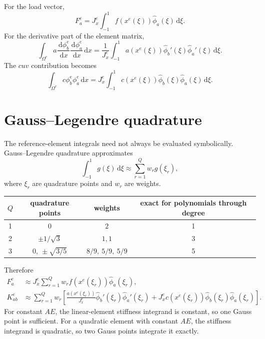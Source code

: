 \documentclass[11pt]{article}
\newcommand{\Om}{\Omega}
\newcommand{\dd}{\,\mathrm{d}}
\begin{document}
For the load vector,
\begin{equation}
F_a^e
=
J_x^e\int_{-1}^{1}
f(x^e(\xi))\widehat\phi_a(\xi)\dd\xi.
\label{eq:ref-load}
\end{equation}
For the derivative part of the element matrix,
\begin{equation}
\int_{\Om^e}
a\frac{\dd\phi_b^e}{\dd x}
\frac{\dd\phi_a^e}{\dd x}\dd x
=
\frac{1}{J_x^e}
\int_{-1}^{1}
a(x^e(\xi))
\widehat\phi_b'(\xi)\widehat\phi_a'(\xi)\dd\xi.
\label{eq:ref-stiffness}
\end{equation}
The $cuv$ contribution becomes
\begin{equation}
\int_{\Om^e}c\phi_b^e\phi_a^e\dd x
=
J_x^e\int_{-1}^{1}
c(x^e(\xi))\widehat\phi_b(\xi)\widehat\phi_a(\xi)\dd\xi.
\label{eq:ref-reaction}
\end{equation}

\section{Gauss--Legendre quadrature}

The reference-element integrals need not always be evaluated symbolically.
Gauss--Legendre quadrature approximates
\begin{equation}
\int_{-1}^{1}g(\xi)\dd\xi
\approx
\sum_{r=1}^{Q}w_rg(\xi_r),
\label{eq:gauss}
\end{equation}
where $\xi_r$ are quadrature points and $w_r$ are weights.

\begin{center}
\begin{tabular}{c c c c}
\toprule
$Q$ & quadrature points & weights & exact for polynomials through degree\\
\midrule
1 & $0$ & $2$ & 1\\
2 & $\pm1/\sqrt3$ & $1,1$ & 3\\
3 & $0,\ \pm\sqrt{3/5}$ & $8/9,\ 5/9,\ 5/9$ & 5\\
\bottomrule
\end{tabular}
\end{center}

Therefore
\begin{align}
F_a^e
&\approx
J_x^e\sum_{r=1}^{Q}
w_r f(x^e(\xi_r))\widehat\phi_a(\xi_r),
\label{eq:gauss-load}\\
K_{ab}^e
&\approx
\sum_{r=1}^{Q}w_r
\left[
\frac{a(x^e(\xi_r))}{J_x^e}
\widehat\phi_b'(\xi_r)\widehat\phi_a'(\xi_r)
+
J_x^e c(x^e(\xi_r))
\widehat\phi_b(\xi_r)\widehat\phi_a(\xi_r)
\right].
\label{eq:gauss-K}
\end{align}
For constant $AE$, the linear-element stiffness integrand is constant, so one
Gauss point is sufficient. For a quadratic element with constant $AE$, the
stiffness integrand is quadratic, so two Gauss points integrate it exactly.
\end{document}
